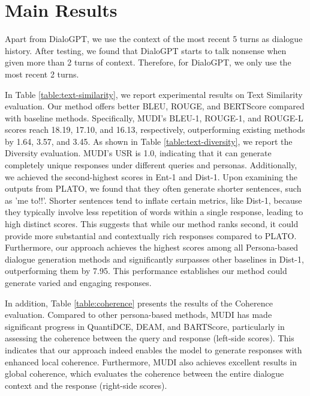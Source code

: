 \section{Main Results}
Apart from DialoGPT, we use the context of the most recent 5 turns as dialogue history. After testing, we found that DialoGPT starts to talk nonsense when given more than 2 turns of context. Therefore, for DialoGPT, we only use the most recent 2 turns.

In Table \ref{table:text-similarity}, we report experimental results on Text Similarity evaluation. Our method offers better BLEU, ROUGE, and BERTScore compared with baseline methods. Specifically, MUDI's BLEU-1, ROUGE-1, and ROUGE-L scores reach 18.19, 17.10, and 16.13, respectively, outperforming existing methods by 1.64, 3.57, and 3.45. As shown in Table \ref{table:text-diversity}, we report the Diversity evaluation. MUDI's USR is 1.0, indicating that it can generate completely unique responses under different queries and personas. Additionally, we achieved the second-highest scores in Ent-1 and Dist-1. Upon examining the outputs from PLATO, we found that they often generate shorter sentences, such as 'me to!!'. Shorter sentences tend to inflate certain metrics, like Dist-1, because they typically involve less repetition of words within a single response, leading to high distinct scores. This suggests that while our method ranks second, it could provide more substantial and contextually rich responses compared to PLATO. Furthermore, our approach achieves the highest scores among all Persona-based dialogue generation methods and significantly surpasses other baselines in Dist-1, outperforming them by 7.95. This performance establishes our method could generate varied and engaging responses.

In addition, Table \ref{table:coherence} presents the results of the Coherence evaluation. Compared to other persona-based methods, MUDI has made significant progress in QuantiDCE, DEAM, and BARTScore, particularly in assessing the coherence between the query and response (left-side scores). This indicates that our approach indeed enables the model to generate responses with enhanced local coherence. Furthermore, MUDI also achieves excellent results in global coherence, which evaluates the coherence between the entire dialogue context and the response (right-side scores).

